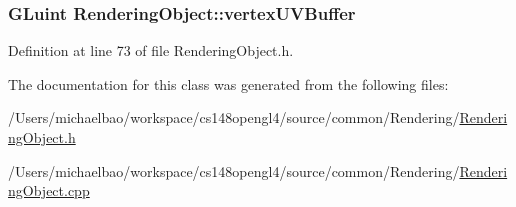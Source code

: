 \subsubsection[{vertex\+U\+V\+Buffer}]{\setlength{\rightskip}{0pt plus 5cm}G\+Luint Rendering\+Object\+::vertex\+U\+V\+Buffer\hspace{0.3cm}{\ttfamily [protected]}}\label{class_rendering_object_ad583c70014e3f6ab0c9b62ea3c96ad25}


Definition at line 73 of file Rendering\+Object.\+h.



The documentation for this class was generated from the following files\+:\begin{DoxyCompactItemize}
\item 
/\+Users/michaelbao/workspace/cs148opengl4/source/common/\+Rendering/\hyperlink{_rendering_object_8h}{Rendering\+Object.\+h}\item 
/\+Users/michaelbao/workspace/cs148opengl4/source/common/\+Rendering/\hyperlink{_rendering_object_8cpp}{Rendering\+Object.\+cpp}\end{DoxyCompactItemize}
